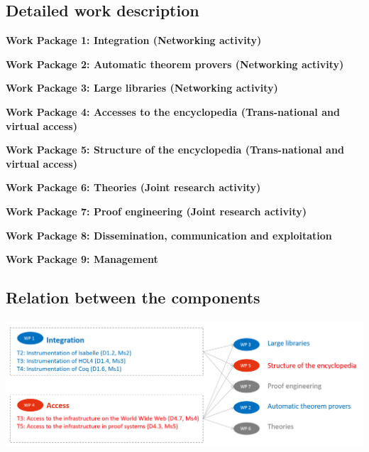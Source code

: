 \subsection{Detailed work description}

\begin{workplan}


  \newcommand\na{(Networking activity)}
  \newcommand\tnva{(Trans-national and virtual access)}
  \newcommand\jra{(Joint research activity)}
  \newcommand\titlewp[3]{\bigskip\noindent\colorbox{color3}{\begin{minipage}\textwidth\bf Work Package #1: #2\end{minipage}}}

\titlewp{1}{Integration \na}{instrumentation}

\titlewp{2}{Automatic theorem provers \na}{atpetc}

\titlewp{3}{Large libraries \na}{libraries}

\titlewp{4}{Accesses to the encyclopedia \tnva}{access}

\titlewp{5}{Structure of the encyclopedia \tnva}{structuring}

\titlewp{6}{Theories \jra}{theories}

\titlewp{7}{Proof engineering \jra}{alignment}

\titlewp{8}{Dissemination, communication and exploitation}{dissemination}

\titlewp{9}{Management}{management}

\end{workplan}



\subsection{Relation between the components}

\includegraphics[width=\textwidth]{img/PERT}

